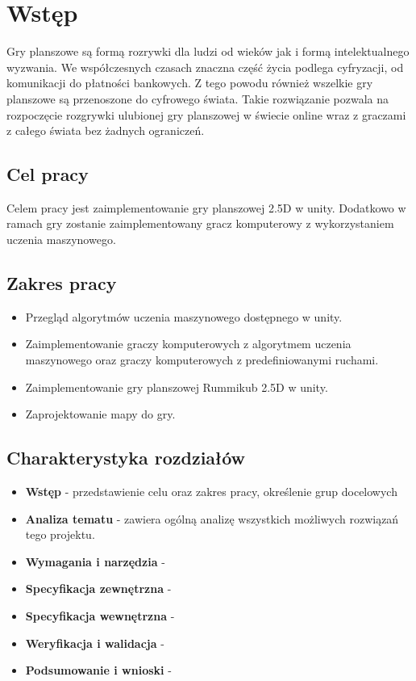 \documentclass[a4paper,twoside,12pt]{book}
\newcounter{stronyPozaNumeracja}
\begin{document}
\setcounter{stronyPozaNumeracja}{\value{page}}
\mainmatter
\pagestyle{empty}

\cleardoublepage

\pagestyle{NumeryStronNazwyRozdzialow}


%
\chapter{Wstęp}%
Gry planszowe są formą rozrywki dla ludzi od wieków jak i formą intelektualnego wyzwania. We współczesnych czasach znaczna część życia podlega cyfryzacji, od komunikacji do płatności bankowych. Z tego powodu również wszelkie gry planszowe są przenoszone do cyfrowego świata. Takie rozwiązanie pozwala na rozpoczęcie rozgrywki ulubionej gry planszowej w świecie online wraz z graczami z całego świata bez żadnych ograniczeń.
\section{Cel pracy} 
Celem pracy jest zaimplementowanie gry planszowej 2.5D w unity. Dodatkowo w ramach gry zostanie zaimplementowany gracz komputerowy z wykorzystaniem uczenia maszynowego.
\section{Zakres pracy}
 
\begin{itemize}
	\item Przegląd algorytmów uczenia maszynowego dostępnego w unity.
	\item Zaimplementowanie graczy komputerowych z algorytmem uczenia maszynowego oraz graczy komputerowych z predefiniowanymi ruchami.
	\item Zaimplementowanie gry planszowej Rummikub 2.5D w unity.
	\item Zaprojektowanie mapy do gry.
\end{itemize} 

\section{Charakterystyka rozdziałów}
\begin{itemize}
	\item \textbf{Wstęp} - przedstawienie celu oraz zakres pracy, określenie grup docelowych
	\item \textbf{Analiza tematu} - zawiera ogólną analizę wszystkich możliwych rozwiązań tego projektu.
	\item  \textbf{Wymagania i narzędzia} - 
	\item\textbf{Specyfikacja zewnętrzna} - 
	\item\textbf{Specyfikacja wewnętrzna} - 
	\item\textbf{Weryfikacja i walidacja} - 
	\item\textbf{Podsumowanie i wnioski} - 
\end{itemize} 
\end{document}
